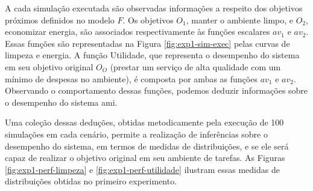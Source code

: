 \begin{figure}[h!]
    \centering
\end{figure}

A cada simulação executada são observadas informações a respeito dos objetivos próximos definidos no modelo $F$. Os objetivos $O_1$, manter o ambiente limpo, e $O_2$, economizar energia, são associados respectivamente às funções escalares $av_1$ e $av_2$. Essas funções são representadas na Figura \ref{fig:exp1-sim-exec} pelas curvas de limpeza e energia. A função Utilidade, que representa o desempenho do sistema em seu objetivo original $O_O$ (prestar um serviço de alta qualidade com um mínimo de despesas no ambiente), é composta por ambas as funções $av_1$ e $av_2$. Observando o comportamento dessas funções, podemos deduzir informações sobre o desempenho do sistema \acrshort{ami}.

Uma coleção dessas deduções, obtidas metodicamente pela execução de 100 simulações em cada cenário, permite a realização de inferências sobre o desempenho do sistema, em termos de medidas de distribuições, e se ele será capaz de realizar o objetivo original em seu ambiente de tarefas. As Figuras \ref{fig:exp1-perf-limpeza} e \ref{fig:exp1-perf-utilidade} ilustram essas medidas de distribuições obtidas no primeiro experimento. 

\begin{figure}[h!]
    \centering
\end{figure}

